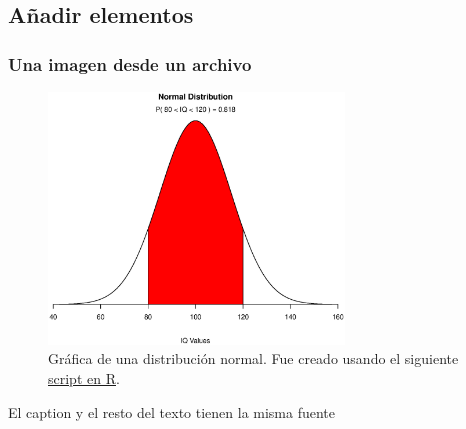 \documentclass{beamer}
\begin{document}
\subsection{Añadir elementos}
\begin{frame}
\frametitle{Una imagen desde un archivo}
\begin{figure}[htb]
  \centering
  \includegraphics[width=0.70\textwidth]{img/normal}
\caption[Distribución normal]{Gráfica de una distribución normal. Fue creado usando el siguiente \href{https://www.statmethods.net/advgraphs/probability.html}{script en R}.}
\end{figure}
El caption y el resto del texto tienen la misma fuente
\end{frame}
\end{document}
